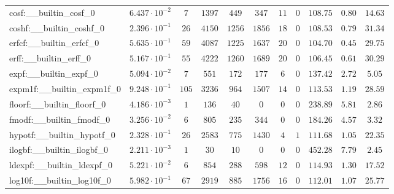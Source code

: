 \begin{tabular}{|l|c|c|c|c|c|c|c|c|c|c|}
cosf:\_\_builtin\_cosf\_0                 & $ 6.437 \cdot 10^{-2} $ & $ 7      $ & $ 1397  $ & $ 449   $ & $ 347   $ & $ 11  $ & $ 0 $ & $ 108.75      $ & $ 0.80    $ & $ 14.63   $ \\
coshf:\_\_builtin\_coshf\_0               & $ 2.396 \cdot 10^{-1} $ & $ 26     $ & $ 4150  $ & $ 1256  $ & $ 1856  $ & $ 18  $ & $ 0 $ & $ 108.53      $ & $ 0.79    $ & $ 31.34   $ \\
erfcf:\_\_builtin\_erfcf\_0               & $ 5.635 \cdot 10^{-1} $ & $ 59     $ & $ 4087  $ & $ 1225  $ & $ 1637  $ & $ 20  $ & $ 0 $ & $ 104.70      $ & $ 0.45    $ & $ 29.75   $ \\
erff:\_\_builtin\_erff\_0                 & $ 5.167 \cdot 10^{-1} $ & $ 55     $ & $ 4222  $ & $ 1260  $ & $ 1689  $ & $ 20  $ & $ 0 $ & $ 106.45      $ & $ 0.61    $ & $ 30.29   $ \\
expf:\_\_builtin\_expf\_0                 & $ 5.094 \cdot 10^{-2} $ & $ 7      $ & $ 551   $ & $ 172   $ & $ 177   $ & $ 6   $ & $ 0 $ & $ 137.42      $ & $ 2.72    $ & $ 5.05    $ \\
expm1f:\_\_builtin\_expm1f\_0             & $ 9.248 \cdot 10^{-1} $ & $ 105    $ & $ 3236  $ & $ 964   $ & $ 1507  $ & $ 14  $ & $ 0 $ & $ 113.53      $ & $ 1.19    $ & $ 28.59   $ \\
floorf:\_\_builtin\_floorf\_0             & $ 4.186 \cdot 10^{-3} $ & $ 1      $ & $ 136   $ & $ 40    $ & $ 0     $ & $ 0   $ & $ 0 $ & $ 238.89      $ & $ 5.81    $ & $ 2.86    $ \\
fmodf:\_\_builtin\_fmodf\_0               & $ 3.256 \cdot 10^{-2} $ & $ 6      $ & $ 805   $ & $ 235   $ & $ 344   $ & $ 0   $ & $ 0 $ & $ 184.26      $ & $ 4.57    $ & $ 3.32    $ \\
hypotf:\_\_builtin\_hypotf\_0             & $ 2.328 \cdot 10^{-1} $ & $ 26     $ & $ 2583  $ & $ 775   $ & $ 1430  $ & $ 4   $ & $ 1 $ & $ 111.68      $ & $ 1.05    $ & $ 22.35   $ \\
ilogbf:\_\_builtin\_ilogbf\_0             & $ 2.211 \cdot 10^{-3} $ & $ 1      $ & $ 30    $ & $ 10    $ & $ 0     $ & $ 0   $ & $ 0 $ & $ 452.28      $ & $ 7.79    $ & $ 2.45    $ \\
ldexpf:\_\_builtin\_ldexpf\_0             & $ 5.221 \cdot 10^{-2} $ & $ 6      $ & $ 854   $ & $ 288   $ & $ 598   $ & $ 12  $ & $ 0 $ & $ 114.93      $ & $ 1.30    $ & $ 17.52   $ \\
log10f:\_\_builtin\_log10f\_0             & $ 5.982 \cdot 10^{-1} $ & $ 67     $ & $ 2919  $ & $ 885   $ & $ 1756  $ & $ 16  $ & $ 0 $ & $ 112.01      $ & $ 1.07    $ & $ 25.77   $ \\

\end{tabular}
